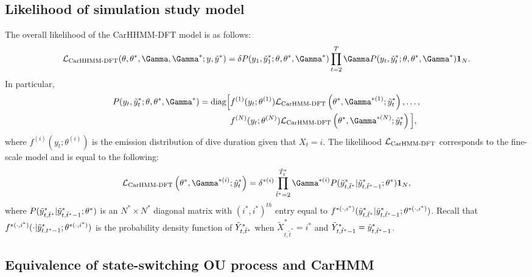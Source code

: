 
\subsection{Likelihood of simulation study model}

The overall likelihood of the CarHHMM-DFT model is as follows:
%
$$\calL_{\text{CarHHMM-DFT}}(\theta,\theta^*,\Gamma,\Gamma^*;y,\z) = \delta P(y_1,\z_1;\theta,\theta^*,\Gamma^*) \prod_{t=2}^T \Gamma P(y_t,\z_t;\theta,\theta^*,\Gamma^*) \mathbf{1}_N.$$
%
In particular,
%
\begin{align*}
P(y_t,\z_t;\theta,\theta^*,\Gamma^*)  = \text{diag}\Big[&f^{(1)}(y_t;\theta^{(1)})\calL_{\text{CarHMM-DFT}}\left(\theta^*,\Gamma^{*(1)};\z_t\right), \ldots , \\
&f^{(N)}(y_t;\theta^{(N)})\calL_{\text{CarHMM-DFT}}\left(\theta^*,\Gamma^{*(N)};\z_t\right) \Big],
\end{align*}
%
where $f^{(i)}(y_t;\theta^{(i)})$ is the emission distribution of dive duration given that $X_t = i$. The likelihood $\mathcal{L}_{\text{CarHMM-DFT}}$ corresponds to the fine-scale model and is equal to the following:
%
$$\calL_{\text{CarHMM-DFT}}\left(\theta^{*},\Gamma^{*(i)};\z_t\right) = \delta^{*(i)} \prod_{\tilde t^* = 2}^{\tilde T^*_t} \Gamma^{*(i)} P(\z_{t,\tilde t^*}|\z_{t,\tilde t^*-1};\theta^*) \mathbf{1}_N,$$
%
where $P(\tilde{y}^*_{t,\tilde t^*}|\tilde{y}^*_{t,\tilde t^*-1};\theta^*)$ is an $N^* \times N^*$ diagonal matrix with $(i^*,i^*)^{th}$ entry equal to $f^{*(\cdot,i^*)}(\tilde{y}^*_{t,\tilde t^*}|\tilde{y}^*_{t,\tilde t^*-1}; \theta^{*(\cdot,i^*)})$.
%
Recall that $f^{*(\cdot,i^*)}(\cdot|\tilde{y}^*_{t,t^*-1}; \theta^{*(\cdot,i^*)})$ is the probability density function of $\tilde{Y}^*_{t,\tilde t^*}$ when $\tilde X^*_{t,\tilde t^*} = i^*$ and $\tilde{Y}^*_{t,\tilde t^*-1} = \tilde{y}^*_{t,\tilde t^*-1}$.


\iffalse

\subsection{Equivalence of state-switching OU process and CarHMM}

